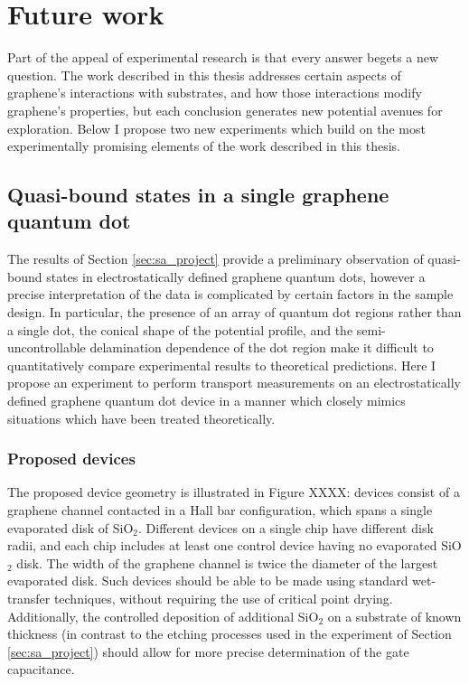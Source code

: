 \documentclass[edeposit,fullpage,draftthesis]{uiucthesis2009}
\begin{document}
    \section{Future work}
    \label{sec:fw}
    
        Part of the appeal of experimental research is that every answer begets a new question.
        The work described in this thesis addresses certain aspects of graphene's interactions with
        substrates, and how those interactions modify graphene's properties, but each conclusion
        generates new potential avenues for exploration.
        Below I propose two new experiments which build on the most experimentally promising elements
        of the work described in this thesis. 
    
        \subsection{Quasi-bound states in a single graphene quantum dot}
        
        The results of Section \ref{sec:sa_project} provide a preliminary observation of quasi-bound states
        in electrostatically defined graphene quantum dots, however a precise interpretation of the data is complicated 
        by certain factors in the sample design. In particular, the presence of an array of 
        quantum dot regions rather than a single dot, the conical shape of the potential profile,
        and the semi-uncontrollable delamination dependence of the dot region make it difficult to 
        quantitatively compare experimental results to theoretical predictions. Here I propose an
        experiment to perform transport measurements on an electrostatically defined graphene 
        quantum dot device in a manner which closely mimics situations which have been treated theoretically.
        
        \subsubsection*{Proposed devices}
        
            The proposed device geometry is illustrated in Figure XXXX: devices consist of 
            a graphene channel contacted in a Hall bar configuration, which
            spans a single evaporated disk of SiO$_2$. Different devices on a single chip
            have different disk radii, and each chip includes at least one control device
            having no evaporated SiO$_2$ disk. The width of the graphene channel is twice
            the diameter of the largest evaporated disk. Such devices should be able to
            be made using standard wet-transfer techniques, without requiring the use of
            critical point drying.
            Additionally, the controlled deposition of additional SiO$_2$ on a substrate of known thickness
            (in contrast to the etching processes used in the experiment of Section \ref{sec:sa_project})
            should allow for more precise determination of the gate capacitance.
        
\end{document}
